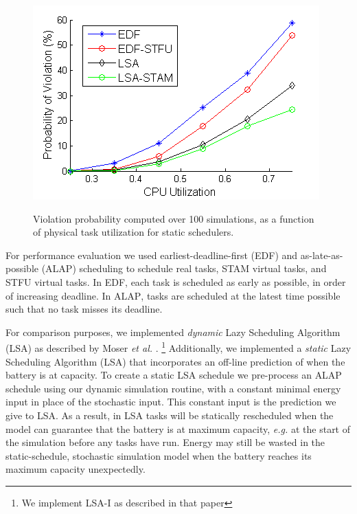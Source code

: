\begin{figure}[tb]
\begin{center}
\includegraphics[scale=0.57]{violations_vs_cpuutil.png}
\label{fig:violations_vs_cpuutil}
\caption{
Violation probability computed over 100 simulations, as a function of physical task utilization for static schedulers.
}
\end{center}
\end{figure}


For performance evaluation we 
used earliest-deadline-first (\textsc{EDF}) and as-late-as-possible (\textsc{ALAP}) scheduling to schedule real tasks, \textsc{STAM} virtual tasks, and \textsc{STFU} virtual tasks. 
In \textsc{EDF}, each task is scheduled as early as possible, in order of increasing deadline.  
In \textsc{ALAP}, tasks are scheduled at the latest time possible such that no task misses its deadline.  

For comparison purposes, we implemented \emph{dynamic} Lazy Scheduling Algorithm (LSA) 
as described by Moser \emph{et al.} \cite{moser2007real}.  
\footnote{We implement \textsc{LSA-I} as described in that paper} 
Additionally, we implemented a \emph{static} Lazy Scheduling Algorithm (LSA) that incorporates 
an off-line prediction of when the battery is at capacity. 
To create a static \textsc{LSA} schedule we pre-process an \textsc{ALAP} schedule using our dynamic simulation routine, with a constant minimal energy input in place of the stochastic input.  This constant input is the prediction we give to \textsc{LSA}.  As a result, in \textsc{LSA} tasks will be statically rescheduled when the model can guarantee that the battery is at maximum capacity, \emph{e.g.} at the start of the simulation before any tasks have run.  Energy may still be wasted in the static-schedule, stochastic simulation model when the battery reaches its maximum capacity unexpectedly.  

